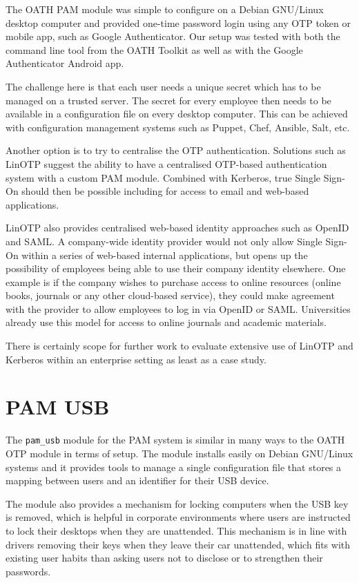 \documentclass{report}
\begin{document}
The OATH PAM module was simple to configure on a Debian GNU/Linux desktop
computer and provided one-time password login using any OTP token or mobile
app, such as Google Authenticator. Our setup was tested with both the
command line tool from the OATH Toolkit as well as with the
Google Authenticator Android app.

The challenge here is that each user needs a unique secret which has to
be managed on a trusted server. The secret for every employee then needs
to be available in a configuration file on every desktop computer. This
can be achieved with configuration management systems such as Puppet,
Chef, Ansible, Salt, etc.

Another option is to try to centralise the OTP authentication.
Solutions such as LinOTP suggest the ability to have a centralised
OTP-based authentication system with a custom PAM module. Combined
with Kerberos, true Single Sign-On should then be possible
including for access to email and web-based applications.

LinOTP also provides centralised web-based identity approaches
such as OpenID and SAML. A company-wide identity provider would
not only allow Single Sign-On within a series of web-based
internal applications, but opens up the possibility of employees
being able to use their company identity elsewhere. One example
is if the company wishes to purchase access to online resources
(online books, journals or any other cloud-based service), they
could make agreement with the provider to allow employees to log in
via OpenID or SAML. Universities already use this model for access to online
journals and academic materials.

There is certainly scope for further work to evaluate extensive
use of LinOTP and Kerberos within an enterprise setting as least as
a case study.

\section{PAM USB}

The \texttt{pam\_usb} module for the PAM system is similar in many
ways to the OATH OTP module in terms of setup. The module
installs easily on Debian GNU/Linux systems and it provides
tools to manage a single configuration file that stores a
mapping between users and an identifier for their USB device.

The module also provides a mechanism for locking computers
when the USB key is removed, which is helpful in corporate
environments where users are instructed to lock their desktops
when they are unattended. This mechanism is in line with
drivers removing their keys when they leave their car
unattended, which fits with existing user
habits than asking users not to disclose or to strengthen
their passwords.
\end{document}

